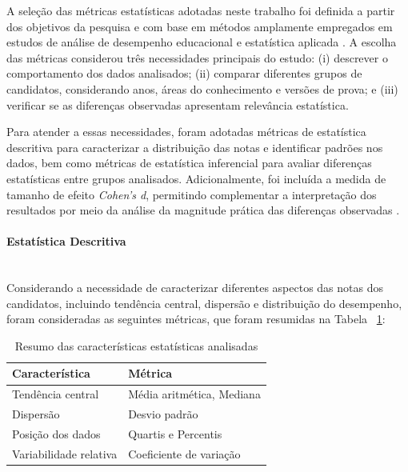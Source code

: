 \documentclass[a4paper,10pt, twocolumn]{article}
\begin{document}
\label{sec:metricas-descritivas-inferenciais}

A seleção das métricas estatísticas adotadas neste trabalho foi definida a partir dos objetivos da pesquisa e com base em métodos amplamente empregados em estudos de análise de desempenho educacional e estatística aplicada \cite{estatistica_descritiva_inferencial,field2018discovering,cohen1988statistical}. A escolha das métricas considerou três necessidades principais do estudo: (i) descrever o comportamento dos dados analisados; (ii) comparar diferentes grupos de candidatos, considerando anos, áreas do conhecimento e versões de prova; e (iii) verificar se as diferenças observadas apresentam relevância estatística.

Para atender a essas necessidades, foram adotadas métricas de estatística descritiva para caracterizar a distribuição das notas e identificar padrões nos dados, bem como métricas de estatística inferencial para avaliar diferenças estatísticas entre grupos analisados. Adicionalmente, foi incluída a medida de tamanho de efeito \textit{Cohen's d}, permitindo complementar a interpretação dos resultados por meio da análise da magnitude prática das diferenças observadas \cite{cohen1988statistical}.

\paragraph{Estatística Descritiva}
\mbox{}\\
Considerando a necessidade de caracterizar diferentes aspectos das notas dos candidatos, incluindo tendência central, dispersão e distribuição do desempenho, foram consideradas as seguintes métricas, que foram resumidas na Tabela ~\ref{tab:metricas}:

\begin{table}[ht]
\centering


\begin{tabular}{ll}
\hline
\textbf{Característica} & \textbf{Métrica} \\
\hline
Tendência central & Média aritmética, Mediana \\
Dispersão & Desvio padrão \\
Posição dos dados & Quartis e Percentis \\
Variabilidade relativa & Coeficiente de variação \\
\hline
\end{tabular}
\caption{Resumo das características estatísticas analisadas}
\label{tab:metricas}
\end{table}
\end{document}
